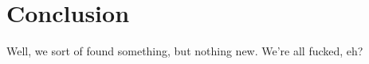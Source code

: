\chapter{Conclusion}
\label{conclusion}

Well, we sort of found something, but nothing new.  We're all fucked, eh?
